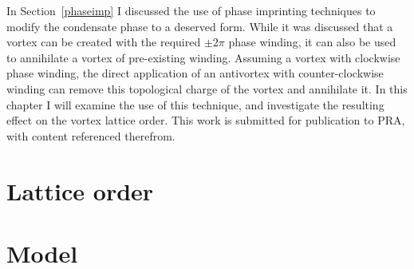 In Section~\ref{phaseimp} I discussed the use of phase imprinting techniques to modify the condensate phase to a deserved form. While it was discussed that a vortex can be created with the required $\pm 2\pi$ phase winding, it can also be used to annihilate a vortex of pre-existing winding. Assuming a vortex with clockwise phase winding, the direct application of an antivortex with counter-clockwise winding can remove this topological charge of the vortex and annihilate it. In this chapter I will examine the use of this technique, and investigate the resulting effect on the vortex lattice order. This work is submitted for publication to PRA, with content referenced therefrom.



\section{Lattice order}\label{sec:model}



\section{Model}\label{sec:model}


